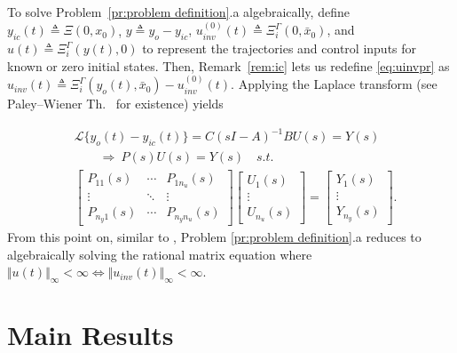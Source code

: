 \documentclass[journal]{IEEEtran}
\theoremstyle{remark}
\begin{document}
To solve Problem~\ref{pr:problem definition}.a algebraically, define 
\(y_{ic}(t) \triangleq \Xi(0, x_0)\), {$y \triangleq y_o-y_{ic}$, 
\(u_{inv}^{(0)}(t) \triangleq \Xi_i^\Gamma(0, \bar{x}_0)\), 
and \(u(t) \triangleq \Xi_i^\Gamma(y(t), 0)\) 
to represent the trajectories and control inputs for known or zero initial states. 
Then, Remark~\ref{rem:ic} lets us redefine \eqref{eq:uinvpr} as
\(u_{inv}(t) \triangleq \Xi_{i}^\Gamma(y_o(t),\bar{x}_0) - u_{inv}^{(0)}(t)\).} Applying the Laplace transform (see Paley--Wiener Th.\ \cite[p.~104]{hoffman2007banach} for existence) yields

\begin{align}
&\mathscr{L} \{ y_o(t) - {y}_{ic}(t)\} = {C}(s{I}-{A})^{-1}{B}U(s) =Y(s) \label{eq:TFM}\\
& \quad \quad \Rightarrow \ P(s)U(s)=Y(s) \quad s.t. \label{eq:algebraic equation} \\   
&\begin{bmatrix} 
P_{11}(s) & \cdots & P_{1n_u}(s) \\
\vdots & \ddots & \vdots \\
P_{n_y1}(s) & \cdots & P_{n_yn_u}(s)
\end{bmatrix}
\begin{bmatrix}
U_1(s) \\
\vdots \\
U_{n_u}(s)
\end{bmatrix}
=
\begin{bmatrix}
Y_1(s) \\
\vdots \\
Y_{n_y}(s)
\end{bmatrix}. \label{eq:algebraic equation2}
\end{align}
From this point on, similar to \cite[Theorem 8.5.2]{wolovich2012linear}, Problem \ref{pr:problem definition}.a reduces to algebraically solving the rational matrix equation where $\Vert u(t) \Vert_\infty < \infty \iff \Vert u_{inv}(t) \Vert_\infty < \infty$.
\section{Main Results} \label{sec:Main}
\end{document}

